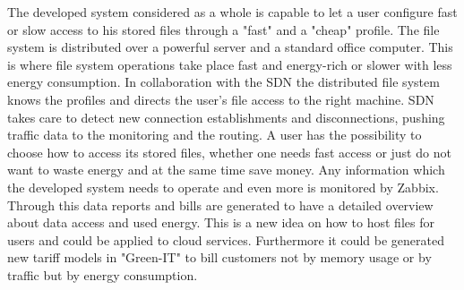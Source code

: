 \label{sec:conclusion}
The developed system considered as a whole is capable to let a user configure fast or slow access to his stored files through a "fast" and a "cheap" profile. The file system is distributed over a powerful server and a standard office computer. This is where file system operations take place fast and energy-rich or slower with less energy consumption. In collaboration with the SDN the distributed file system knows the profiles and directs the user's file access to the right machine. SDN takes care to detect new connection establishments and disconnections, pushing traffic data to the monitoring and the routing. A user has the possibility to choose how to access its stored files, whether one needs fast access or just do not want to waste energy and at the same time save money. Any information which the developed system needs to operate and even more is monitored by Zabbix. Through this data reports and bills are generated to have a detailed overview about data access and used energy. This is a new idea on how to host files for users and could be applied to cloud services. Furthermore it could be generated new tariff models in "Green-IT" to bill customers not by memory usage or by traffic but by energy consumption.